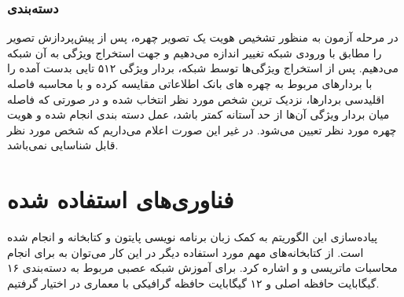 \subsubsection{دسته‌بندی}
در مرحله آزمون به منظور تشخیص هویت یک تصویر چهره، پس از پیش‌پردازش تصویر را مطابق با ورودی شبکه تغییر اندازه می‌دهیم و جهت استخراج ویژگی‌ به آن شبکه می‌دهیم. پس از استخراج ویژگی‌ها توسط شبکه، بردار ویژگی ۵۱۲ تایی بدست آمده را با بردارهای مربوط به چهره های بانک اطلاعاتی مقایسه کرده و با محاسبه فاصله اقلیدسی بردارها، نزدیک ترین شخص مورد نظر انتخاب شده و در صورتی که فاصله میان بردار ویژگی آن‌ها از حد آستانه کمتر باشد، عمل دسته بندی انجام شده و هویت چهره مورد نظر تعیین می‌شود. در غیر این صورت اعلام می‌داریم که شخص مورد نظر قابل شناسایی نمی‌باشد.

\section{فناوری‌های استفاده شده}
پیاده‌سازی این الگوریتم به کمک زبان برنامه‌ نویسی پایتون و کتابخانه  و  انجام شده است. از کتابخانه‌های مهم مورد استفاده دیگر در این کار می‌‌توان به  برای انجام محاسبات ماتریسی و  و  اشاره کرد. برای آموزش شبکه عصبی مربوط به دسته‌بندی ۱۶ گیگابایت حافظه اصلی و ۱۲ گیگابایت حافظه گرافیکی با معماری  در اختیار گرفتیم.
